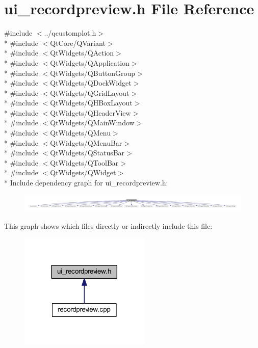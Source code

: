 \hypertarget{a00053}{\section{ui\+\_\+recordpreview.\+h File Reference}
\label{a00053}
}
{\ttfamily \#include $<$../qcustomplot.\+h$>$}\\*
{\ttfamily \#include $<$Qt\+Core/\+Q\+Variant$>$}\\*
{\ttfamily \#include $<$Qt\+Widgets/\+Q\+Action$>$}\\*
{\ttfamily \#include $<$Qt\+Widgets/\+Q\+Application$>$}\\*
{\ttfamily \#include $<$Qt\+Widgets/\+Q\+Button\+Group$>$}\\*
{\ttfamily \#include $<$Qt\+Widgets/\+Q\+Dock\+Widget$>$}\\*
{\ttfamily \#include $<$Qt\+Widgets/\+Q\+Grid\+Layout$>$}\\*
{\ttfamily \#include $<$Qt\+Widgets/\+Q\+H\+Box\+Layout$>$}\\*
{\ttfamily \#include $<$Qt\+Widgets/\+Q\+Header\+View$>$}\\*
{\ttfamily \#include $<$Qt\+Widgets/\+Q\+Main\+Window$>$}\\*
{\ttfamily \#include $<$Qt\+Widgets/\+Q\+Menu$>$}\\*
{\ttfamily \#include $<$Qt\+Widgets/\+Q\+Menu\+Bar$>$}\\*
{\ttfamily \#include $<$Qt\+Widgets/\+Q\+Status\+Bar$>$}\\*
{\ttfamily \#include $<$Qt\+Widgets/\+Q\+Tool\+Bar$>$}\\*
{\ttfamily \#include $<$Qt\+Widgets/\+Q\+Widget$>$}\\*
Include dependency graph for ui\+\_\+recordpreview.\+h\+:
\nopagebreak
\begin{figure}[H]
\begin{center}
\leavevmode
\includegraphics[width=350pt]{d6/d4b/a00277}
\end{center}
\end{figure}
This graph shows which files directly or indirectly include this file\+:
\nopagebreak
\begin{figure}[H]
\begin{center}
\leavevmode
\includegraphics[width=176pt]{dc/d5d/a00278}
\end{center}
\end{figure}
